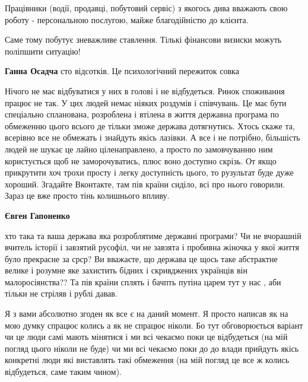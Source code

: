 \begin{itemize}
\begin{itemize}
Працівники (водії, продавці, побутовий сервіс) з якогось дива вважають свою
роботу - персональною послугою, майже благодійністю до клієнта.

Саме тому побутує зневажливе ставлення. Тількі фінансови визиски можуть
поліпшити ситуацію!

\textbf{Ганна Осадча} сто відсотків. Це психологічний пережиток совка
\end{itemize} %


Нічого не має відбуватися у них в голові і не відбудеться. Ринок споживання
працює не так. У цих людей немає ніяких роздумів і співчувань. Це має бути
спеціально спланована, розроблена і втілена в життя державна програма по
обмеженню цього всього де тільки зможе держава дотягнутись. Хтось скаже та,
всерівно все не обмежать і знайдуть якісь лазівки. А все і не потрібно,
більшість людей не шукає це лайно ціленаправлено, а просто по замовчуванню ним
користується щоб не заморочуватись, плюс воно доступно скрізь. От якщо
прикрутити хоч трохи просту і легку доступність цього, то рузультат буде дуже
хороший. Згадайте Вконтакте, там пів країни сиділо, всі про нього говорили.
Зараз це вже просто тінь колишнього впливу.

\begin{itemize} %
\textbf{Євген Гапоненко} 

хто така та ваша держава яка розроблятиме державні програми? Чи не вчорашній
вчитель історії і завзятий русофіл, чи не завзята і пробивна жіночка у якої
життя було прекрасне за срср? Ви вважаєте, що держава це щось таке абстрактне
велике і розумне яке захистить бідних і скривджених українців він
малоросіянства?? Та пів країни сплять і бачпть путіна царем тут у нас , аби
тільки не стріляв і рублі давав.


Я з вами абсолютно згоден як все є на даний момент. Я просто написав як на мою
думку спрацює колись а як не спрацює ніколи. Бо тут обговорюється варіант чи це
люди самі мають мінятися і ми всі чекаємо поки це відбудеться (на мій погляд
цього ніколи не буде) чи ми всі чекаємо поки до до влади прийдуть якісь
конкретні люди які виставлять такі обмеження (на мій погляд це все ж колись
відбудеться, саме таким чином).

\end{itemize} %



\end{itemize}

